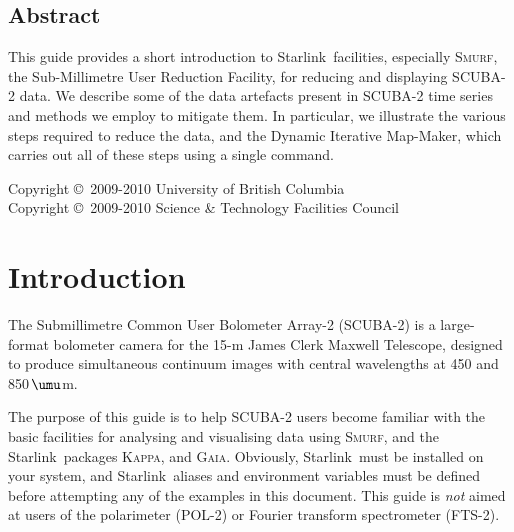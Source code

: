 \documentclass[twoside,11pt]{article}
\newcommand{\micron}{\mbox{\,${\umu}$m}}            %
\newcommand{\stardocinitials}  {SC}
\newcommand{\stardoccopyright}
{Copyright \copyright\ 2009-2010 University of British Columbia \\
 Copyright \copyright\ 2009-2010 Science \& Technology Facilities Council}
\newcommand{\stardocnumber}    {19.3}
\newcommand{\stardocabstract}  {

  This guide provides a short introduction to \starlink\ facilities,
  especially \smurf, the Sub-Millimetre User Reduction Facility, for
  reducing and displaying SCUBA-2 data. We describe some of the data
  artefacts present in SCUBA-2 time series and methods we employ to
  mitigate them. In particular, we illustrate the various steps
  required to reduce the data, and the Dynamic Iterative Map-Maker,
  which carries out all of these steps using a single command.}
\newcommand{\stardocname}{\stardocinitials /\stardocnumber}
\newcommand{\htmladdnormallink}[2]{#1}
\newenvironment{latexonly}{}{}
\newcommand{\xref}[3]{#1}
\newcommand{\xlabel}[1]{}
\renewcommand{\_}{\texttt{\symbol{95}}}
\newcommand{\starlink}{\htmladdnormallink{Starlink}{http://starlink.jach.hawaii.edu}}
\newcommand{\Kappa}{\xref{\textsc{Kappa}}{sun95}{}}
\newcommand{\gaia}{\xref{\textsc{Gaia}}{sun214}{}}
\newcommand{\smurf}{\xref{\textsc{Smurf}}{sun258}{}}
\renewcommand{\thepage}{\roman{page}}
\begin{document}
\begin{htmlonly}
  \section{\xlabel{abstract}Abstract}
\end{htmlonly}

\stardocabstract

\begin{latexonly}
\newpage
\vspace*{\fill}
\stardoccopyright
\end{latexonly}

  \newpage
  \begin{latexonly}
    \setlength{\parskip}{0mm}
    \tableofcontents
    \setlength{\parskip}{\medskipamount}
    \markboth{\stardocname}{\stardocname}
  \end{latexonly}

\cleardoublepage
\renewcommand{\thepage}{\arabic{page}}
\setcounter{page}{1}

\section{\xlabel{introduction}Introduction}
\label{sec:intro}

The Submillimetre Common User Bolometer Array-2 (SCUBA-2) is a
large-format bolometer camera for the 15-m James Clerk Maxwell
Telescope, designed to produce simultaneous continuum images with
central wavelengths at 450 and 850\micron.

The purpose of this guide is to help SCUBA-2 users become familiar
with the basic facilities for analysing and visualising data using
\smurf \cite{smurf}, and the \starlink\ packages \Kappa \cite{kappa},
and \gaia \cite{gaia}. Obviously, \starlink\ must be installed on your
system, and \starlink\ aliases and environment variables must be
defined before attempting any of the examples in this document.  This
guide is {\em not} aimed at users of the polarimeter (POL-2) or
Fourier transform spectrometer (FTS-2).
\end{document}

